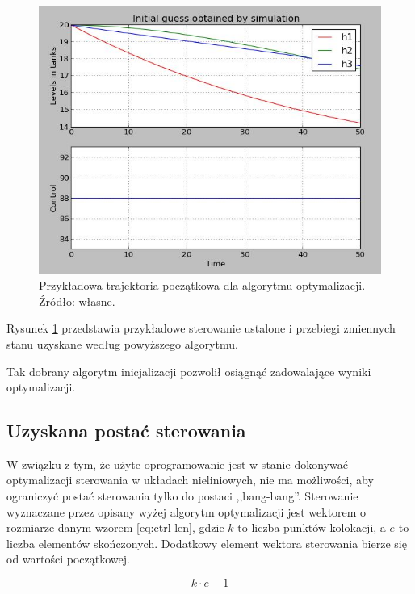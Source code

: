 \begin{figure}[ht]
    \centering
    \includegraphics[scale=0.9]{Grafika/initial_guess}
    \caption{Przykładowa trajektoria początkowa dla algorytmu optymalizacji. Źródło: własne.}
    \label{fig:initialguess}
\end{figure}

Rysunek \ref{fig:initialguess} przedstawia przykładowe sterowanie ustalone i przebiegi zmiennych stanu uzyskane według powyższego algorytmu.

Tak dobrany algorytm inicjalizacji pozwolił osiągnąć zadowalające wyniki optymalizacji.


\subsection{Uzyskana postać sterowania}
\label{sub:opt-ctrl-form}

W związku z tym, że użyte oprogramowanie jest w stanie dokonywać optymalizacji sterowania w układach nieliniowych, nie ma możliwości, aby ograniczyć postać sterowania tylko do postaci ,,bang-bang''. Sterowanie wyznaczane przez opisany wyżej algorytm optymalizacji jest wektorem o rozmiarze danym wzorem \ref{eq:ctrl-len}, gdzie $k$ to liczba punktów kolokacji, a $e$ to liczba elementów skończonych. Dodatkowy element wektora sterowania bierze się od wartości początkowej.

\begin{equation}\label{eq:ctrl-len}
k \cdot e + 1
\end{equation}

